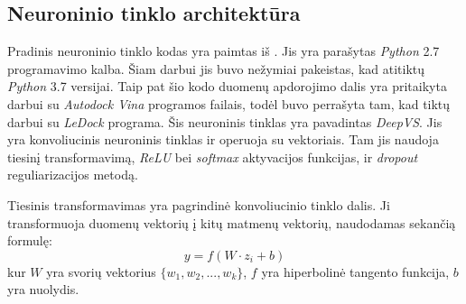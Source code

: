 




\subsection{Neuroninio tinklo architektūra}


Pradinis neuroninio tinklo kodas yra paimtas iš \cite{pereira_boosting_2016}. Jis yra parašytas \emph{Python} 2.7 programavimo kalba. Šiam darbui jis buvo nežymiai pakeistas, kad atitiktų \emph{Python} 3.7 versijai. Taip pat šio kodo duomenų apdorojimo dalis yra pritaikyta darbui su \emph{Autodock Vina} programos failais, todėl buvo perrašyta tam, kad tiktų darbui su \emph{LeDock} programa. Šis neuroninis tinklas yra pavadintas \emph{DeepVS}. Jis yra konvoliucinis neuroninis tinklas ir operuoja su vektoriais. Tam jis naudoja tiesinį transformavimą, \emph{ReLU} bei \emph{softmax} aktyvacijos funkcijas, ir \emph{dropout} reguliarizacijos metodą.

Tiesinis transformavimas yra pagrindinė konvoliucinio tinklo dalis. Ji transformuoja duomenų vektorių į kitų matmenų vektorių, naudodamas sekančią formulę:
\begin{equation}
y = f(W\cdot z_{i} + b)
\end{equation}
kur $W$ yra svorių vektorius $\{w_1, w_2, ..., w_k\}$, $f$ yra hiperbolinė tangento funkcija, $b$ yra nuolydis.  %

